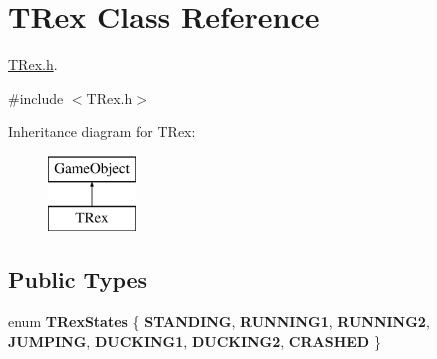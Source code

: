 \hypertarget{class_t_rex}{}\section{T\+Rex Class Reference}
\label{class_t_rex}


\mbox{\hyperlink{_t_rex_8h_source}{T\+Rex.\+h}}.  




{\ttfamily \#include $<$T\+Rex.\+h$>$}

Inheritance diagram for T\+Rex\+:\begin{figure}[H]
\begin{center}
\leavevmode
\includegraphics[height=2.000000cm]{class_t_rex}
\end{center}
\end{figure}
\subsection*{Public Types}
\begin{DoxyCompactItemize}
\item 
\mbox{\label{class_t_rex_a000c4d51b41f07886af073a6b7b3e063}} 
enum {\bfseries T\+Rex\+States} \{ \newline
{\bfseries S\+T\+A\+N\+D\+I\+NG}, 
{\bfseries R\+U\+N\+N\+I\+N\+G1}, 
{\bfseries R\+U\+N\+N\+I\+N\+G2}, 
{\bfseries J\+U\+M\+P\+I\+NG}, 
\newline
{\bfseries D\+U\+C\+K\+I\+N\+G1}, 
{\bfseries D\+U\+C\+K\+I\+N\+G2}, 
{\bfseries C\+R\+A\+S\+H\+ED}
 \}
\end{DoxyCompactItemize}
